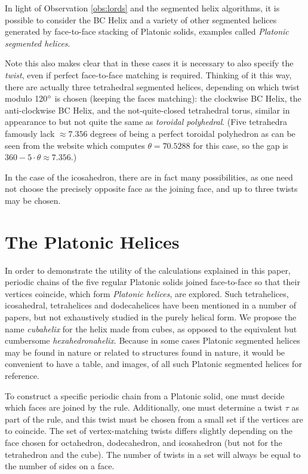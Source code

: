 \documentclass[11pt]{article}
\begin{document}
{In light of Observation \ref{obs:lords} and the segmented helix algorithms, it is possible to
consider the BC Helix and a variety of other segmented helices generated by
face-to-face stacking of Platonic solids, examples called {\em Platonic segmented helices}.

Note this also makes clear that in these cases it is necessary to also specify the {\em twist},
even if perfect face-to-face matching is required.
Thinking of it this
way, there are actually three tetrahedral segmented helices,
depending on which twist modulo 120$\degree$
is chosen (keeping the faces matching): the clockwise BC Helix, the anti-clockwise BC Helix, and the
not-quite-closed tetrahedral torus, similar in appearance to but not quite the same as
{\em toroidal polyhedral}\cite{wiki:toroidalpolyhedra}.
(Five tetrahedra famously lack $\approx 7.356$ degrees of being a perfect toroidal polyhedron
as can be seen from the website which computes $\theta = 70.5288$ for this case,
so the gap is $360 - 5 \cdot \theta \approx 7.356$.)

In the case of the icosahedron, there are in fact many possibilities,
as one need not choose the precisely opposite face as the joining face, and
up to three twists may be chosen.


\section{The Platonic Helices}

\label{sec:platonic}

In order to demonstrate the utility of the calculations explained in this paper,
periodic chains of the five regular Platonic solids joined face-to-face so that their vertices coincide,
which form {\em Platonic helices}, are explored.
Such tetrahelices, icosahedral, tetrahelices and dodecahelices
have been mentioned in a number of papers\cite{elgersma2016quadrahelix,babiker2012combinatorial,lord2001sphere}, but not exhaustively studied in
the purely helical form.
We propose the name {\em cubahelix} for the helix made from cubes, as opposed to the equivalent
but cumbersome {\em hexahedronahelix}.
Because in some cases Platonic segmented helices may be found in nature or
related to structures found in nature\cite{lord2004gamma,pearce1990structure},
it would be convenient to have a table, and images, of all such Platonic segmented helices for reference.

To construct a specific periodic chain from a Platonic solid,
one must decide which faces are joined by the rule.
Additionally, one must determine a twist
$\tau$ as part of the rule, and this twist must be chosen from a small set if the vertices are to coincide.
The set of vertex-matching twists differs slightly depending on the face chosen for octahedron, dodecahedron, and icosahedron
(but not for the tetrahedron and the cube). The number of twists in a set will always be equal to the number of sides on a face.

}
\end{document}
